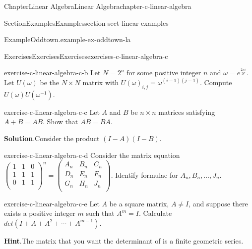 \documentclass[oneside,10pt,]{book}
\newcommand{\blocktitlefont}{\relax}
\numberwithin{equation}{section}
\begin{document}
\begin{chapterptx}{Chapter}{Linear Algebra}{}{Linear Algebra}{}{}{chapter-c-linear-algebra}
\begin{sectionptx}{Section}{Examples}{}{Examples}{}{}{section-sect-linear-examples}
\begin{example}{Example}{Oddtown.}{example-ex-oddtown-la}
\end{example}
\end{sectionptx}
%
%
\typeout{************************************************}
\typeout{************************************************}
%
\begin{exercises-section}{Exercises}{Exercises}{}{Exercises}{}{}{exercises-c-linear-algebra-c}
\begin{divisionexercise}{1}{}{}{exercise-c-linear-algebra-c-b}%
Let \(N=2^n\) for some positive integer \(n\) and \(\omega =e^{\frac{2\pi i}{N}}\).  Let \(U(\omega )\) be the \(N\times N\) matrix with \(U(\omega)_{i,j}= \omega^{(i-1)(j-1)}\).  Compute \(U(\omega )U\left(\omega ^{-1}\right)\).%
\end{divisionexercise}%
\begin{divisionexercise}{2}{}{}{exercise-c-linear-algebra-c-c}%
Let \(A\) and \(B\) be \(n\times n\) matrices satisfying \(A+B = A B\). Show that \(A B = B A\).%
\par\smallskip%
\noindent\textbf{\blocktitlefont Solution}.\hypertarget{solution-c-linear-algebra-c-c-b}{}\quad{}Consider the product \((I-A)(I-B)\).%
\end{divisionexercise}%
\begin{divisionexercise}{3}{}{}{exercise-c-linear-algebra-c-d}%
Consider the matrix equation \(\left(
\begin{array}{ccc}
1 & 1 & 0 \\
1 & 1 & 1 \\
0 & 1 & 1 \\
\end{array}
\right)^n=\left(
\begin{array}{ccc}
A_n & B_n & C_n \\
D_n & E_n & F_n \\
G_n & H_n & J_n \\
\end{array}
\right)\).  Identify formulae for \(A_n, B_n,\ldots , J_n\).%
\end{divisionexercise}%
\begin{divisionexercise}{4}{}{}{exercise-c-linear-algebra-c-e}%
Let \(A\) be a square matrix, \(A \neq I\), and suppose there exists a positive integer \(m\) such that \(A^m=I\).  Calculate \(det(I + A + A^2 + \cdots + A^{m-1})\).%
\par\smallskip%
\noindent\textbf{\blocktitlefont Hint}.\hypertarget{hint-c-linear-algebra-c-e-b}{}\quad{}The matrix that you want the determinant of is a finite geometric series.%
\par\smallskip%

\end{divisionexercise}
\end{exercises-section}
\end{chapterptx}
\end{document}
